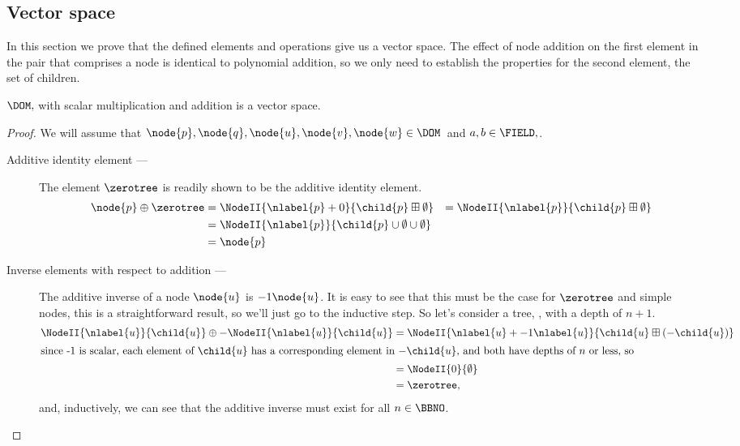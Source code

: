 \begin{definition}
\section{Vector space}
In this section we prove that the defined elements and operations give
us a vector space.  The effect of node addition on the first element
in the pair that comprises a node is identical to polynomial addition,
so we only need to establish the properties for the second element,
the set of children.  


\begin{proposition}\label{vspace} $\DOM,$ with scalar multiplication and addition is a vector space.
  \begin{proof}
    We will assume that  $\node{p}, \node{q}, \node{u},\node{v},\node{w} \in \DOM$\ and $a, b \in  \FIELD,$.

    \begin{description} 
    \item[Additive identity element --- ] The element $\zerotree$ is readily shown to be the
      additive identity element.
      \begin{align}
        \node{p}\oplus\zerotree&=\NodeII{\nlabel{p}+0}{\child{p}\boxplus\emptyset}
        &=\NodeII{\nlabel{p}}{\child{p}\boxplus\emptyset}\\
        &=\NodeII{\nlabel{p}}{\child{p}\cup\emptyset\cup\emptyset}\\
        &=\node{p}\\
      \end{align}

    \item[Inverse elements with respect to addition --- ]
      The additive inverse of a node $\node{u}$ is $-1\node{u}$. It is easy to see that
      this must be the case for $\zerotree$ and simple nodes, this is a
      straightforward result, so we'll just go to the inductive step.
      \goodbreak
      So let's consider a tree, , with a depth of $n+1$.
      \begin{align}
        \NodeII{\nlabel{u}}{\child{u}}\oplus-\NodeII{\nlabel{u}}{\child{u}}&=\NodeII{\nlabel{u} +
          -1\nlabel{u}}{\child{u}\boxplus(-\child{u})}\\ \intertext{since
          -1 is scalar, each element of $\child{u}$ has a
          corresponding element in $-\child{u}$, and both have depths
          of $n$ or less, so}
        &=\NodeII{0}{\emptyset} \\
        &= \zerotree,
      \end{align}
      and, inductively, we can see that the additive inverse must exist for all $n\in\BBNO$.


\end{description}
\end{proof}
\end{proposition}
\end{definition}
